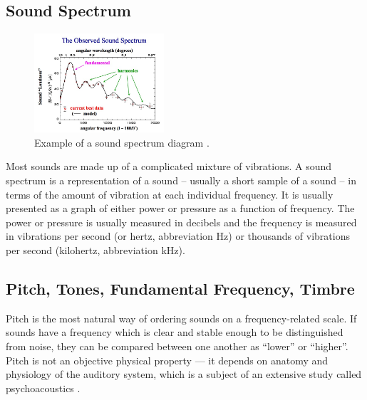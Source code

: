 \vspace{10pt}

\subsection{Sound Spectrum}

\begin{figure}
  \vspace{-50pt}

  \begin{center}
    \includegraphics[width=0.43\textwidth]{Figures/soundspectrum}
  \end{center}
  \caption{Example of a sound spectrum diagram \cite{soundspectrum}.}
  \label{fig:soundspectrumexample}
\end{figure}


Most sounds are made up of a complicated mixture of vibrations. A sound spectrum is a representation of a sound – usually a short sample of a sound – in terms of the amount of vibration at each individual frequency. It is usually presented as a graph of either power or pressure as a function of frequency. The power or pressure is usually measured in decibels and the frequency is measured in vibrations per second (or hertz, abbreviation Hz) or thousands of vibrations per second (kilohertz, abbreviation kHz). 

\vspace{10pt}

\subsection{Pitch, Tones, Fundamental Frequency, Timbre}

Pitch is the most natural way of ordering sounds on a frequency-related scale. If sounds have a frequency which is clear and stable enough to be distinguished from noise, they can be compared between one another as “lower” or “higher”. Pitch is not an objective physical property — it depends on anatomy and physiology of the auditory system, which is a subject of an extensive study called psychoacoustics \cite{pitch}. 

